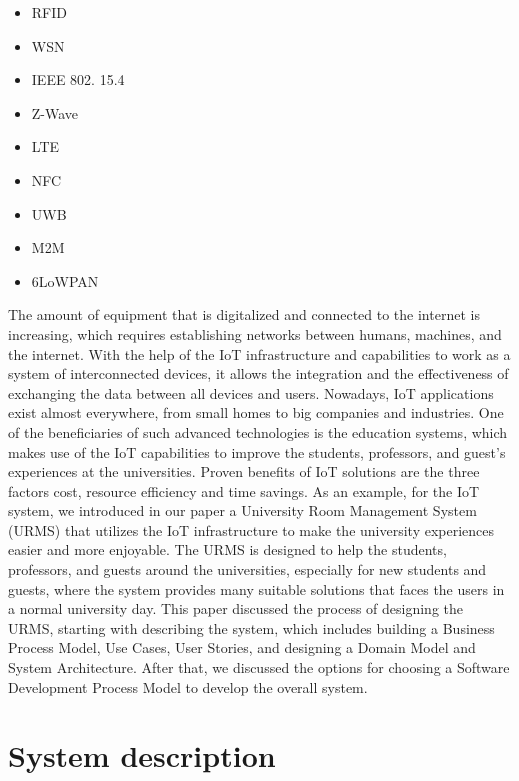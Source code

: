 \documentclass[conference,onecolumn]{IEEEtran}
\begin{document}
\begin{multicols}{2} %
	\begin{center}
		\begin{itemize}
			\item RFID
			\item WSN
			\item IEEE 802. 15.4
			\item Z-Wave
			\item LTE
			\item NFC
			\item UWB
			\item M2M
			\item 6LoWPAN	
		\end{itemize}
	\end{center}
\end{multicols}
	
The amount of equipment that is digitalized and connected to the internet is increasing, which requires establishing networks between humans, machines, and the internet. With the help of the IoT infrastructure and capabilities to work as a system of interconnected devices, it allows the integration and the effectiveness of exchanging the data between all devices and users. Nowadays, IoT applications exist almost everywhere, from small homes to big companies and industries. One of the beneficiaries of such advanced technologies is the education systems, which makes use of the IoT capabilities to improve the students, professors, and guest’s experiences at the universities. Proven benefits of IoT solutions are the three factors cost, resource efficiency and time savings. As an example, for the IoT system, we introduced in our paper a University Room Management System (URMS) that utilizes the IoT infrastructure to make the university experiences easier and more enjoyable. The URMS is designed to help the students, professors, and guests around the universities, especially for new students and guests, where the system provides many suitable solutions that faces the users in a normal university day. 
This paper discussed the process of designing the URMS, starting with describing the system, which includes building a Business Process Model, Use Cases, User Stories, and designing a Domain Model and System Architecture. After that, we discussed the options for choosing a Software Development Process Model to develop the overall system. 


\section{System description}
\end{document}

